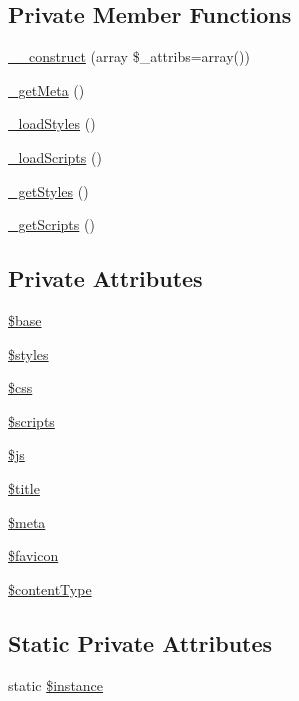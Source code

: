 \subsection*{Private Member Functions}
\begin{DoxyCompactItemize}
\item 
\hyperlink{classDocument_a826011efca3734aa7e11e467e5978af2}{\_\-\_\-construct} (array \$\_\-attribs=array())
\item 
\hyperlink{classDocument_a53f0ed9a11539f3b05c58177a1fd17de}{\_\-getMeta} ()
\item 
\hyperlink{classDocument_a028acb7648c597466fe1d0759eaa2dc5}{\_\-loadStyles} ()
\item 
\hyperlink{classDocument_ad85ed59a203fdab7be3683e24e7e797f}{\_\-loadScripts} ()
\item 
\hyperlink{classDocument_af7c9033e29bbaf426a3be9ecb58357f5}{\_\-getStyles} ()
\item 
\hyperlink{classDocument_a1c4fc6edfec7cba79755ee26f9618cc5}{\_\-getScripts} ()
\end{DoxyCompactItemize}
\subsection*{Private Attributes}
\begin{DoxyCompactItemize}
\item 
\hyperlink{classDocument_a5a5f2c002eaff3b5c0d0c2ef85b3496d}{\$base}
\item 
\hyperlink{classDocument_a5ef42574b069d405190dea3a7d977cb2}{\$styles}
\item 
\hyperlink{classDocument_a635d9d19a754911129ac92e8b00f4f31}{\$css}
\item 
\hyperlink{classDocument_a011e1486a1c78776019df42ed652f6f0}{\$scripts}
\item 
\hyperlink{classDocument_aff8d5c694d27719238793df5c3dbe55f}{\$js}
\item 
\hyperlink{classDocument_a7cd6b0f7a5c8926d8b89e23bee51e7f5}{\$title}
\item 
\hyperlink{classDocument_a4b2a3fc78ec084611daef3343dca3756}{\$meta}
\item 
\hyperlink{classDocument_ad74353c065d3fe06667bc549ed0977e7}{\$favicon}
\item 
\hyperlink{classDocument_ab1cd325e8c6dc65ec0512e759d120b0e}{\$contentType}
\end{DoxyCompactItemize}
\subsection*{Static Private Attributes}
\begin{DoxyCompactItemize}
\item 
static \hyperlink{classDocument_a2699d681667ea5a811ec6da1bf2a5087}{\$instance}
\end{DoxyCompactItemize}


